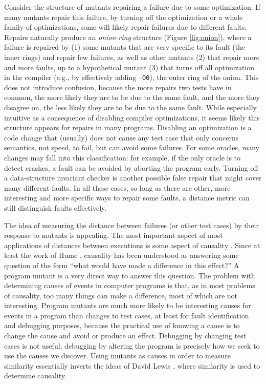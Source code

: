 Consider the structure of mutants repairing a failure due to some optimization.  If many mutants repair this failure, by turning off the optimization or a whole family of optimizations, some will likely repair failures due to different faults.  Repairs naturally produce an \emph{onion-ring} structure (Figure \ref{fig:onion}), where a failure is repaired by (1) some mutants that are very specific to its fault (the inner rings) and repair few failures, as well as other mutants (2) that repair more and more faults, up to a hypothetical mutant (3) that turns off all optimization in the compiler (e.g., by effectively adding {\tt -O0}), the outer ring of the onion.  This does not introduce confusion, because the more repairs two tests have in common, the more likely they are to be due to the same fault, and the more they disagree on, the less likely they are to be due to the same fault.  While especially intuitive as a consequence of disabling compiler optimizations, it seems likely this structure appears for repairs in many programs.  Disabling an optimization is a code change that (usually) does not cause any test case that only concerns semantics, not speed, to fail, but can avoid some failures.  For some oracles, many changes may fall into this classification:  for example, if the only oracle is to detect crashes, a fault can be avoided by aborting the program early.  Turning off a data-structure invariant checker is another possible false repair that might cover many different faults.  In all these cases, so long as there are other, more interesting and more specific ways to repair some faults, a distance metric can still distinguish faults effectively.

The idea of measuring the distance between failures (or other test cases) by their response to mutants is appealing.  The most important aspect of most applications of distances between executions is some aspect of causality \cite{LewisCause,ZellerBook}.  Since at least the work of Hume \cite{Hume1}, causality has been understood as answering some question of the form ``what would have made a difference in this effect?''  A program mutant is a very direct way to answer this question.  The problem with determining causes of events in computer programs is that, as in most problems of causality, too many things can make a difference, most of which are not interesting.  Program mutants are much more likely to be interesting causes for events in a program than changes to test cases, at least for fault identification and debugging purposes, because the practical use of knowing a cause is to change the cause and avoid or produce an effect.  Debugging by changing test cases is not useful; debugging by altering the program is precisely how we seek to use the causes we discover.  Using mutants as causes in order to measure similarity essentially inverts the ideas of David Lewis \cite{LewisCause,LewisCount}, where similarity is used to determine causality.  

